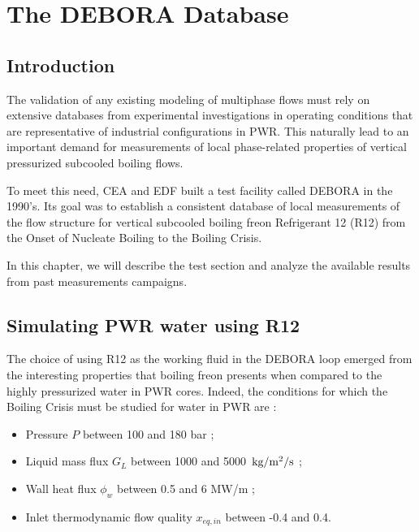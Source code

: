 
\chapter{The DEBORA Database} %

\minitoc

\section{Introduction}

\label{ch:debora} %

The validation of any existing modeling of multiphase flows must rely on extensive databases from experimental investigations in operating conditions that are representative of industrial configurations in PWR. This naturally lead to an important demand for measurements of local phase-related properties of vertical pressurized subcooled boiling flows. 

\npar
To meet this need, CEA and EDF built a test facility called DEBORA in the 1990's. Its goal was to establish a consistent database of local measurements of the flow structure for vertical subcooled boiling freon Refrigerant 12 (R12) from the Onset of Nucleate Boiling to the Boiling Crisis.

\npar

In this chapter, we will describe the test section and analyze the available results from past measurements campaigns.


\section{Simulating PWR water using R12}

The choice of using R12 as the working fluid in the DEBORA loop emerged from the interesting properties that boiling freon presents when compared to the highly pressurized water in PWR cores. Indeed, the conditions for which the Boiling Crisis must be studied for water in PWR are :

\begin{itemize}
\item Pressure $P$ between 100 and 180 bar ;
\item Liquid mass flux $G_{L}$ between 1000 and 5000~$\text{kg/m$^{2}$/s}$ ;
\item Wall heat flux $\phi_{w}$ between 0.5 and 6 MW/m ;
\item Inlet thermodynamic flow quality $x_{eq,in}$ between -0.4 and 0.4.
\end{itemize}

